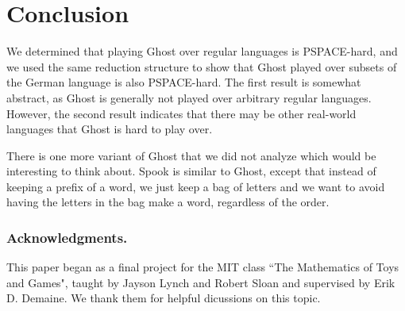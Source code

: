 \documentclass[runningheads,a4paper]{llncs}
\begin{document}
\section{Conclusion}
\label{Conclusion}

We determined that playing Ghost over regular languages is PSPACE-hard, and we used the same reduction structure to show that Ghost played over subsets of the German language is also PSPACE-hard. The first result is somewhat abstract, as Ghost is generally not played over arbitrary regular languages. However, the second result indicates that there may be other real-world languages that Ghost is hard to play over.

There is one more variant of Ghost that we did not analyze which would be interesting to think about. Spook is similar to Ghost, except that instead of keeping a prefix of a word, we just keep a bag of letters and we want to avoid having the letters in the bag make a word, regardless of the order.

\subsubsection*{Acknowledgments.} This paper began as a final project for the MIT class ``The Mathematics of Toys and Games", taught by Jayson Lynch and Robert Sloan and supervised by Erik D. Demaine. We thank them for helpful dicussions on this topic.



\end{document}
